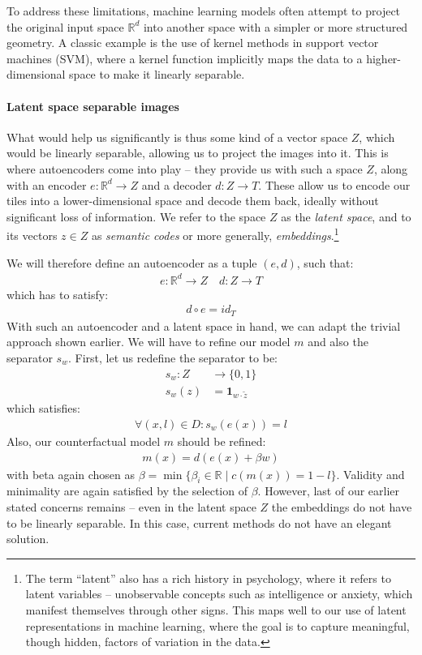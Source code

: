 To address these limitations, machine learning models often attempt to project the original input space $\mathbb{R}^d$ into another space with a simpler or more structured geometry. A classic example is the use of kernel methods in support vector machines (SVM), where a kernel function implicitly maps the data to a higher-dimensional space to make it linearly separable.

\paragraph{Latent space separable images} What would help us significantly is thus some kind of a vector space $Z$,
which would be linearly separable, allowing us to project the images into it. This is where autoencoders come into play -- they provide us with such a space $Z$, along with an encoder $e : \mathbb{R}^d \to Z$ and a decoder $d: Z \to T$. These allow us to encode our tiles into a lower-dimensional space and decode them back, ideally without significant loss of information. We refer to the space $Z$ as the \emph{latent space}, and to its vectors $z \in Z$ as \emph{semantic codes} or more generally, \emph{embeddings}.\footnote{The term \enquote{latent} also has a rich history in psychology, where it refers to latent variables -- unobservable concepts such as intelligence or anxiety, which manifest themselves through other signs. This maps well to our use of latent representations in machine learning, where the goal is to capture meaningful, though hidden, factors of variation in the data.}

We will therefore define an autoencoder as a tuple $(e,d)$, such that:
\begin{align*}
    e : \mathbb{R}^d \to Z \quad d : Z \to T
\end{align*}
which has to satisfy:
\begin{align*}
    d \circ e = \textit{id}_T
\end{align*}
With such an autoencoder and a latent space in hand, we can adapt the trivial approach shown earlier. We will have to refine our model $m$ and also the separator $s_w$. First, let us redefine the separator to be:
\begin{align*}
    s_w: Z &\to \{0,1\} \\
    s_w(z) &= \textbf{1}_{w \cdot \tilde{z}} 
\end{align*}
which satisfies:
\begin{align*}
    \forall (x,l) \in D: s_w(e(x)) = l
\end{align*}
Also, our counterfactual model $m$ should be refined:
\begin{align*}
    m(x) = d(e(x) + \beta w)
\end{align*}
with beta again chosen as $\beta = \min \{ \beta_i \in \mathbb{R} \mid c(m(x)) = 1 - l\}$. Validity and minimality are again satisfied by the selection of $\beta$. 
However, last of our earlier stated concerns remains -- even in the latent space $Z$ the embeddings do not have to be linearly separable. In this case, current methods do not have an elegant solution.


